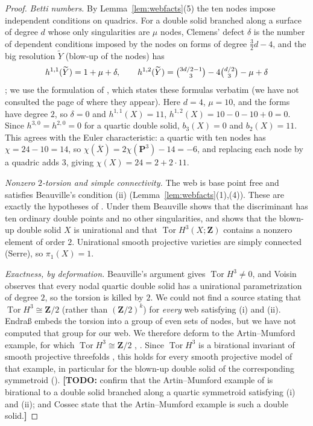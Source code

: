 \documentclass[11pt]{amsart}
\newcommand{\todo}[1]{{\color{red}\textbf{[TODO:} #1\textbf{]}}}
\numberwithin{equation}{section}
\theoremstyle{definition}
\theoremstyle{remark}
\newcommand{\Z}{\mathbf Z}
\newcommand{\PP}{\mathbf P}
\DeclareMathOperator{\Tor}{Tor}
\begin{document}
\begin{proof}
\emph{Betti numbers.} By Lemma~\ref{lem:webfacts}(5) the ten nodes impose
independent conditions on quadrics. For a double solid branched along a
surface of degree $d$ whose only singularities are $\mu$ nodes, Clemens'
defect $\delta$ is the number of dependent conditions imposed by the nodes
on forms of degree $\tfrac32d-4$, and the big resolution $\widetilde Y$
(blow-up of the nodes) has
\[
  h^{1,1}(\widetilde Y)=1+\mu+\delta,\qquad
  h^{1,2}(\widetilde Y)=\tbinom{3d/2-1}{3}-4\tbinom{d/2}{3}-\mu+\delta
\]
\cite{Clemens1983}; we use the formulation of \cite[\S1 and
Cor.~5.1]{Cynk2008}, which states these formulas verbatim (we have not
consulted the page of \cite{Clemens1983} where they appear). Here
$d=4$, $\mu=10$, and the forms have degree $2$, so $\delta=0$ and
$h^{1,1}(X)=11$, $h^{1,2}(X)=10-0-10+0=0$. Since $h^{3,0}=h^{2,0}=0$
for a quartic double solid, $b_3(X)=0$ and $b_2(X)=11$. This agrees with
the Euler characteristic: a quartic with ten nodes has $\chi=24-10=14$,
so $\chi(\overline X)=2\chi(\PP^3)-14=-6$, and replacing each node by a
quadric adds $3$, giving $\chi(X)=24=2+2\cdot11$.

\emph{Nonzero $2$-torsion and simple connectivity.} The web is base point
free and satisfies Beauville's condition (ii)
(Lemma~\ref{lem:webfacts}(1),(4)). These are exactly the hypotheses of
\cite[\S6.3]{Beauville2015}. Under them Beauville shows that the
discriminant has ten ordinary double points and no other singularities,
and \cite[Thm.~6 and its proof]{Beauville2015} shows that the blown-up
double solid $X$ is unirational and that $\Tor H^3(X;\Z)$ contains a
nonzero element of order $2$. Unirational smooth projective varieties are
simply connected (Serre), so $\pi_1(X)=1$.

\emph{Exactness, by deformation.} Beauville's argument gives
$\Tor H^3\ne0$, and Voisin \cite[proof of Cor.~2.6]{Voisin2015}
observes that every nodal quartic double solid has a unirational
parametrization of degree $2$, so the torsion is killed by $2$. We could
not find a source stating that $\Tor H^3\cong\Z/2$ (rather than
$(\Z/2)^k$) for \emph{every} web satisfying (i) and (ii). Endra{\ss}
\cite[Lemma~1.2]{Endrass1999} embeds the torsion into a group of even
sets of nodes, but we have not computed that group for our web.
We therefore deform to the Artin--Mumford example, for which
$\Tor H^3\cong\Z/2$ \cite{ArtinMumford1972}, \cite[Constr.~2.2]{Deligne1973}.
Since $\Tor H^3$ is a birational invariant of smooth projective
threefolds \cite[Prop.~2.1]{Deligne1973}, this holds for every smooth
projective model of that example, in particular for the blown-up double
solid of the corresponding symmetroid (\cite[\S6.3]{Beauville2015}).
\todo{confirm that the Artin--Mumford example of \cite{Deligne1973} is
birational to a double solid branched along a quartic symmetroid
satisfying (i) and (ii); \cite[\S6.3]{Beauville2015} and Cossec state that
the Artin--Mumford example is such a double solid.}


\end{proof}
\end{document}
